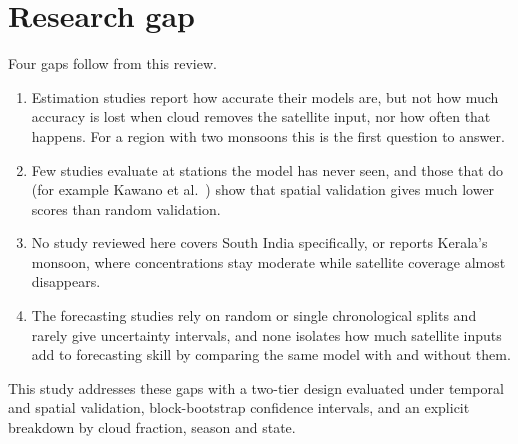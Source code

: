 \section{Research gap}

Four gaps follow from this review.

\begin{enumerate}
  \item Estimation studies report how accurate their models are, but not how much accuracy is
        lost when cloud removes the satellite input, nor how often that happens. For a region with
        two monsoons this is the first question to answer.
  \item Few studies evaluate at stations the model has never seen, and those that do (for
        example Kawano et al.\ \cite{kawano2025india}) show that spatial validation gives much lower
        scores than random validation.
  \item No study reviewed here covers South India specifically, or reports Kerala's monsoon, where
        concentrations stay moderate while satellite coverage almost disappears.
  \item The forecasting studies rely on random or single chronological splits and rarely give
        uncertainty intervals, and none isolates how much satellite inputs add to forecasting
        skill by comparing the same model with and without them.
\end{enumerate}

This study addresses these gaps with a two-tier design evaluated under temporal and spatial
validation, block-bootstrap confidence intervals, and an explicit breakdown by cloud fraction,
season and state.

